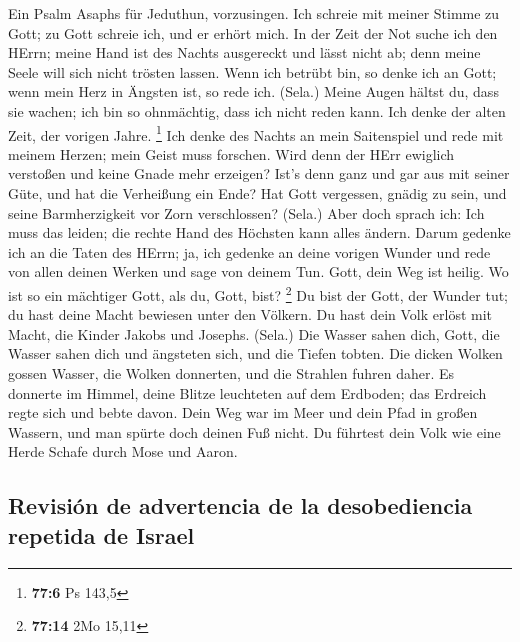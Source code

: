  Ein Psalm Asaphs für Jeduthun, vorzusingen.
 Ich schreie mit meiner Stimme zu Gott; zu Gott schreie
ich, und er erhört mich.  In der Zeit der Not suche ich
den HErrn; meine Hand ist des Nachts ausgereckt und lässt nicht ab; denn
meine Seele will sich nicht trösten lassen.  Wenn ich
betrübt bin, so denke ich an Gott; wenn mein Herz in Ängsten ist, so
rede ich. (Sela.)  Meine Augen hältst du, dass sie wachen;
ich bin so ohnmächtig, dass ich nicht reden kann.  Ich
denke der alten Zeit, der vorigen Jahre. \footnote{\textbf{77:6} Ps
  143,5}  Ich denke des Nachts an mein Saitenspiel und
rede mit meinem Herzen; mein Geist muss forschen.  Wird
denn der HErr ewiglich verstoßen und keine Gnade mehr erzeigen?
 Ist's denn ganz und gar aus mit seiner Güte, und hat die
Verheißung ein Ende?  Hat Gott vergessen, gnädig zu sein,
und seine Barmherzigkeit vor Zorn verschlossen? (Sela.) 
Aber doch sprach ich: Ich muss das leiden; die rechte Hand des Höchsten
kann alles ändern.  Darum gedenke ich an die Taten des
HErrn; ja, ich gedenke an deine vorigen Wunder  und rede
von allen deinen Werken und sage von deinem Tun.  Gott,
dein Weg ist heilig. Wo ist so ein mächtiger Gott, als du, Gott, bist?
\footnote{\textbf{77:14} 2Mo 15,11}  Du bist der Gott,
der Wunder tut; du hast deine Macht bewiesen unter den Völkern.
 Du hast dein Volk erlöst mit Macht, die Kinder Jakobs
und Josephs. (Sela.)  Die Wasser sahen dich, Gott, die
Wasser sahen dich und ängsteten sich, und die Tiefen tobten.
 Die dicken Wolken gossen Wasser, die Wolken donnerten,
und die Strahlen fuhren daher.  Es donnerte im Himmel,
deine Blitze leuchteten auf dem Erdboden; das Erdreich regte sich und
bebte davon.  Dein Weg war im Meer und dein Pfad in
großen Wassern, und man spürte doch deinen Fuß nicht.  Du
führtest dein Volk wie eine Herde Schafe durch Mose und Aaron.

\hypertarget{revisiuxf3n-de-advertencia-de-la-desobediencia-repetida-de-israel}{%
\subsection{Revisión de advertencia de la desobediencia repetida de
Israel}\label{revisiuxf3n-de-advertencia-de-la-desobediencia-repetida-de-israel}}

